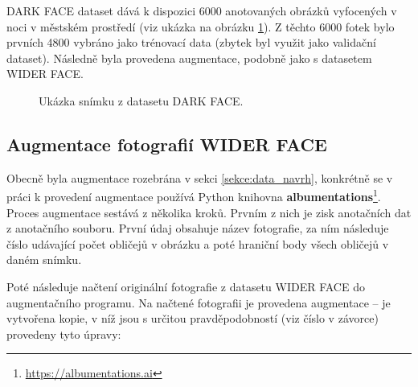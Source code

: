 DARK FACE dataset dává k dispozici 6000 anotovaných obrázků vyfocených v noci v městském prostředí (viz ukázka na obrázku \ref{obrazek:darkfaceexample}). Z těchto 6000 fotek bylo prvních 4800 vybráno jako trénovací data (zbytek byl využit jako validační dataset). Následně byla provedena augmentace, podobně jako s datasetem WIDER FACE.

\begin{figure}[H]
  \begin{center}
  \label{obrazek:darkfaceexample}
  \caption{Ukázka snímku z datasetu DARK FACE.}
  \end{center}
\end{figure}

\subsection*{Augmentace fotografií WIDER FACE}
Obecně byla augmentace rozebrána v sekci \ref{sekce:data_navrh}, konkrétně se v práci k provedení augmentace používá Python knihovna \textbf{albumentations}\footnote{\url{https://albumentations.ai}}. Proces augmentace sestává z několika kroků. Prvním z nich
je zisk anotačních dat z anotačního souboru. První údaj obsahuje název fotografie, za ním následuje číslo udávající počet obličejů v obrázku a poté hraniční body všech obličejů v daném snímku.

Poté následuje načtení originální fotografie z datasetu WIDER FACE do augmentačního programu. Na načtené fotografii je provedena augmentace -- je vytvořena kopie, v níž jsou s určitou pravděpodobností (viz číslo v závorce) provedeny tyto úpravy:

